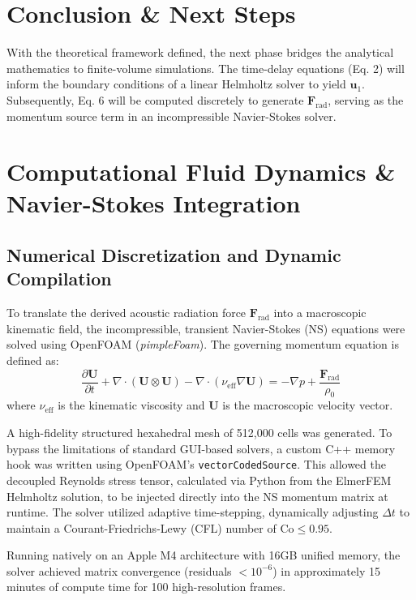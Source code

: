 \documentclass[journal, 10pt]{IEEEtran}
\begin{document}
\section{Conclusion \& Next Steps}
With the theoretical framework defined, the next phase bridges the analytical mathematics to finite-volume simulations. The time-delay equations (Eq. 2) will inform the boundary conditions of a linear Helmholtz solver to yield $\mathbf{u}_1$. Subsequently, Eq. 6 will be computed discretely to generate $\mathbf{F}_{\text{rad}}$, serving as the momentum source term in an incompressible Navier-Stokes solver.

\section{Computational Fluid Dynamics \& Navier-Stokes Integration}
\subsection{Numerical Discretization and Dynamic Compilation}
To translate the derived acoustic radiation force $\mathbf{F}_{\text{rad}}$ into a macroscopic kinematic field, the incompressible, transient Navier-Stokes (NS) equations were solved using OpenFOAM (\textit{pimpleFoam}). The governing momentum equation is defined as:
\begin{equation}
    \frac{\partial \mathbf{U}}{\partial t} + \nabla \cdot (\mathbf{U} \otimes \mathbf{U}) - \nabla \cdot (\nu_{\text{eff}} \nabla \mathbf{U}) = -\nabla p + \frac{\mathbf{F}_{\text{rad}}}{\rho_0}
\end{equation}
where $\nu_{\text{eff}}$ is the kinematic viscosity and $\mathbf{U}$ is the macroscopic velocity vector. 

A high-fidelity structured hexahedral mesh of 512,000 cells was generated. To bypass the limitations of standard GUI-based solvers, a custom C++ memory hook was written using OpenFOAM's \texttt{vectorCodedSource}. This allowed the decoupled Reynolds stress tensor, calculated via Python from the ElmerFEM Helmholtz solution, to be injected directly into the NS momentum matrix at runtime. The solver utilized adaptive time-stepping, dynamically adjusting $\Delta t$ to maintain a Courant-Friedrichs-Lewy (CFL) number of $\text{Co} \le 0.95$. 

Running natively on an Apple M4 architecture with 16GB unified memory, the solver achieved matrix convergence (residuals $<10^{-6}$) in approximately 15 minutes of compute time for 100 high-resolution frames.
\end{document}
